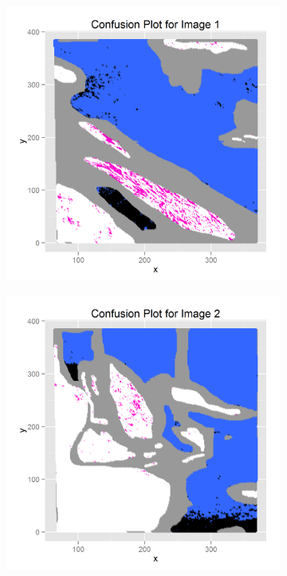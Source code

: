 \documentclass{article}\usepackage[]{graphicx}\usepackage[]{color}
\begin{document}
\begin{figure}[h]
  \centering 
  \begin{subfigure}[b]{0.3\textwidth}
    \includegraphics[width=\linewidth]{qda1_12fold_conf}
    \label{qda1_conf}
  \end{subfigure} 
  \begin{subfigure}[b]{0.3\textwidth}
    \includegraphics[width=\linewidth]{qda2_12fold_conf}

\end{subfigure}
\end{figure}
\end{document}

